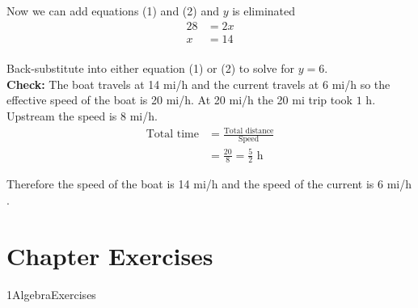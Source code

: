  Now we can add equations (1) and (2) and $y$ is eliminated
 \begin{align*}28 &  =  2 x \\
 x &  =  14\end{align*} \\
 Back-substitute into either equation (1) or (2) to solve for $y =  6$.\medskip\\
 \textbf{Check:} The boat travels at 14 $\mbox{mi}$/$\mbox{h}$ and the current travels at 6 $\mbox{mi}$/$\mbox{h}$ so the effective speed of the boat is 20 $\mbox{mi}$/$\mbox{h}$. At 20 $\mbox{mi}$/$\mbox{h}$ the 20 $\mbox{mi}$ trip took $1$ $\mbox{h}$. Upstream the speed is 8 $\mbox{mi}$/$\mbox{h}$.
 \begin{align*}\text{Total time} &  =  \frac{\text{Total distance}}{\text{Speed}} \\
 &  =  \frac{20}{8} =\frac{5}{2} \text{ h}\end{align*}
 
 Therefore the speed of the boat is 14 $\mbox{mi}$/$\mbox{h}$ and the speed of the current is 6 $\mbox{mi}$/$\mbox{h}$.
 \clearpage
\section{Chapter Exercises}
{1AlgebraExercises}
